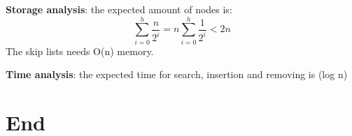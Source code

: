 \documentclass[11pt,twoside,landscape]{article}
\begin{document}
\begin{multicols}{2}
\textbf{Storage analysis}: the expected amount of nodes is:
\begin{equation*}
\sum_{i=0}^h \frac{n}{2^i} = n \sum_{i=0}^h\frac{1}{2^i} < 2n
\end{equation*}
The skip lists needs O(n) memory.

\textbf{Time analysis}: the expected time for search, insertion and removing is (log n)

\section*{End}
\label{sec:org80cc475}

\end{multicols}
\end{document}
